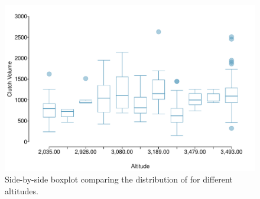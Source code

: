 \begin{doublespace}
\begin{figure}
	\centering
	\includegraphics[width=\textwidth]{ch_intro_to_data_oi_biostat/figures/frogClutchVolAlt/frogClutchVolAlt}
	\caption{Side-by-side boxplot comparing the distribution of  for different altitudes.}
	\label{frogClutchVolAlt}
\end{figure} 

\end{doublespace}

